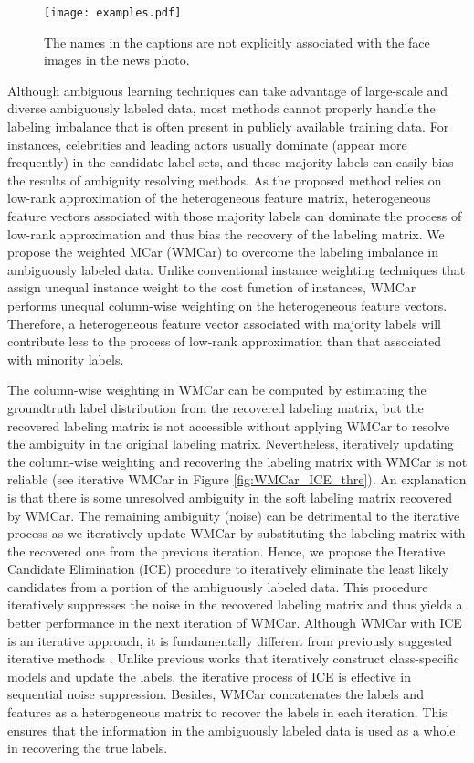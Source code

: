 \documentclass[10pt,journal,compsoc]{IEEEtran}
\begin{document}
\begin{figure}[t]
\centering
\texttt{[image: examples.pdf]}
\caption{The names in the captions are not explicitly associated with the face images in the news photo.}
\label{fig:newsphoto}
\end{figure}

Although ambiguous learning techniques can take advantage of large-scale and diverse ambiguously labeled data, most methods cannot properly handle the labeling imbalance that is often present in publicly available training data. For instances, celebrities and leading actors usually dominate (appear more frequently) in the candidate label sets, and these majority labels can easily bias the results of ambiguity resolving methods.  As the proposed method relies on low-rank approximation of the heterogeneous feature matrix, heterogeneous feature vectors associated with those majority labels can dominate the process of low-rank approximation and thus bias the recovery of the labeling matrix. We propose the weighted MCar (WMCar) to overcome the labeling imbalance in ambiguously labeled data. Unlike conventional instance weighting techniques \cite{He2009lfi} that assign unequal instance weight to the cost function of instances, WMCar performs unequal column-wise weighting on the heterogeneous feature vectors. Therefore, a heterogeneous feature vector associated with majority labels will contribute less to the process of low-rank approximation than that associated with minority labels.


The column-wise weighting in WMCar can be computed by estimating the groundtruth label distribution from the recovered labeling matrix, but the recovered labeling matrix is not accessible without applying WMCar to resolve the ambiguity in the original labeling matrix.
Nevertheless, iteratively updating the column-wise weighting and recovering the labeling matrix with WMCar is not reliable (see iterative WMCar in Figure \ref{fig:WMCar_ICE_thre}). An explanation is that there is some unresolved ambiguity in the soft labeling matrix recovered by WMCar. The remaining ambiguity (noise) can be detrimental to the iterative process as we iteratively update WMCar by substituting the labeling matrix with the recovered one from the previous iteration.
Hence, we propose the Iterative Candidate Elimination (ICE) procedure to iteratively eliminate the least likely candidates from a portion of the ambiguously labeled data.
This procedure iteratively suppresses the noise in the recovered labeling matrix and thus yields a better performance in the next iteration of WMCar. Although WMCar with ICE is an iterative approach, it is fundamentally different from previously suggested iterative methods \cite{Zeng2013,Chen2013,Chen2014all}. Unlike previous works that iteratively construct class-specific models and update the labels, the iterative process of ICE is effective in sequential noise suppression. Besides, WMCar concatenates the labels and features as a heterogeneous matrix to recover the labels in each iteration. This ensures that the information in the ambiguously labeled data is used as a whole in recovering the true labels.
\end{document}
